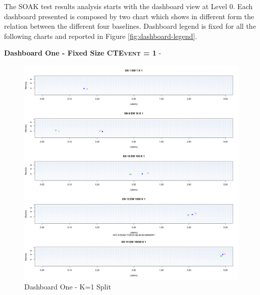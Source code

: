 The SOAK test results analysis starts with the dashboard view at Level 0. Each dashboard presented is composed by two chart which shows in different form the relation between the different four baselines. Dashboard legend is fixed for all the following charts and reported in Figure \ref{fig:dashboard-legend}.

\textbf{Dashboard One - Fixed Size \textsc{CTEvent} = 1} - 

\begin{figure}[htb]
	\centering
	\includegraphics[width=0.90\linewidth]{images/dashboard-1-split}	
	\caption[\textsc{Analyser} Investigation Stack - Level 0 - Dashboard One - Split Version]{Dashboard One - K=1 Split} 
	\label{fig:result_dashboard_ka}
\end{figure}

